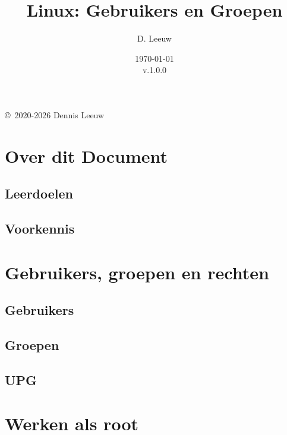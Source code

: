 \documentclass[a4paper,12pt,twoside,openright,titlepage]{book}
\author{D. Leeuw}
\title{Linux: Gebruikers en Groepen}
\date{\today\\v.1.0.0}
\begin{document}

\maketitle

\copyright\ 2020-2026 Dennis Leeuw\\




\frontmatter
\chapter{Over dit Document}
\section{Leerdoelen}

\section{Voorkennis}

%
%

\tableofcontents

\mainmatter

\chapter{Gebruikers, groepen en rechten}

\section{Gebruikers}

\section{Groepen}

\section{UPG}

\chapter{Werken als root}

\end{document}
